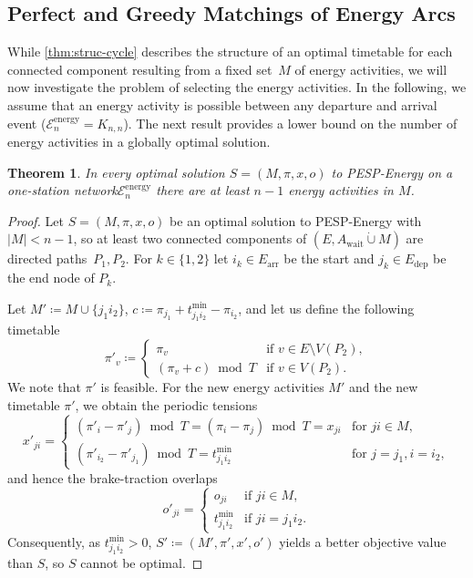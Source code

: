\documentclass[11pt,a4paper]{article}
\newcommand{\dotcup}{\mathbin{\dot\cup}}
\newcommand{\arr}{\mathrm{arr}}
\newcommand{\dep}{\mathrm{dep}}
\newcommand{\wait}{\mathrm{wait}}
\newcommand{\energy}{\mathrm{energy}}
\newcommand{\energyact}{M}               %
\newcommand{\pespenergy}{PESP-Energy\xspace}
\newcommand{\osn}{one-station network\xspace}
\newcommand{\cE}{\mathcal{E}}
\newtheorem{theorem}{Theorem}[section]
\theoremstyle{definition}
\theoremstyle{remark}
\begin{document}
\subsection{Perfect and Greedy Matchings of Energy Arcs} \label{subsec:matching}

While \cref{thm:struc-cycle} describes the structure of an optimal timetable for each connected component resulting from a fixed set~$\energyact$ of energy activities, we will now investigate the problem of selecting the energy activities.
%
In the following, we assume that an energy activity is possible between any departure and arrival event ($\cE_n^{\energy} = K_{n,n}$). The next result provides a lower bound on the number of energy activities in a globally optimal solution. 

\begin{theorem}\label{thm:matchingsize}
	In every optimal solution $S = (\energyact, \pi, x, o)$ to \pespenergy on a \osn $\cE_n^{\energy}$ there are at least $n-1$ energy activities in $\energyact$. 
\end{theorem}

\begin{proof}
	Let $S = (\energyact, \pi, x, o)$ be an optimal solution to \pespenergy with $|\energyact| < n-1$, so at least two connected components of $(E, A_\wait \dotcup \energyact)$ are directed paths~$P_1, P_2$. For $k \in \{1,2\}$ let $i_k \in E_\arr$ be the start and $j_k \in E_\dep$ be the end node of $P_k$.
	
	Let $\energyact' \coloneqq \energyact \cup \{ j_1i_2 \}$, $c \coloneqq \pi_{j_1} + t^{\min}_{j_1i_2} - \pi_{i_2}$, and let us define the following timetable
	\[
	\pi'_v \coloneqq \begin{cases} \pi_v &\text{if } v \in E\setminus V(P_2), \\
		(\pi_v + c) \bmod T &\text{if } v \in V(P_2).
	\end{cases}
	\]
    We note that $\pi'$ is feasible. 
    For the new energy activities $\energyact'$ and the new timetable $\pi'$, we obtain the periodic tensions
	\[x'_{ji} = \begin{cases}
		(\pi'_i - \pi'_j) \bmod T = (\pi_i - \pi_j) \bmod T = x_{ji} &\text{for } ji \in \energyact,\\
		(\pi'_{i_2} - \pi'_{j_1}) \bmod T = t_{j_1i_2}^{\min} &\text{for } j=j_1, i=i_2,
	\end{cases}\]
	and hence the brake-traction overlaps
	\[
	o'_{ji} = \begin{cases}
		o_{ji} &\text{if } ji \in \energyact, \\
		t^{\min}_{j_1i_2} &\text{if } ji = j_1i_2.
	\end{cases}
	\]
	Consequently, as $t^{\min}_{j_1i_2} > 0$, $S' \coloneqq (\energyact', \pi', x', o')$ yields a better objective value than $S$, so $S$ cannot be optimal.
\end{proof}
\end{document}

